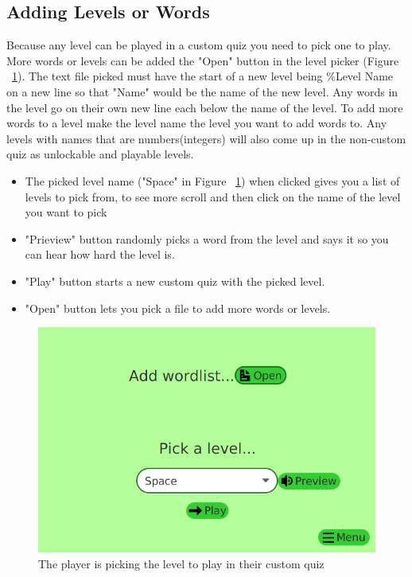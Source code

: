 \documentclass[12pt,a4paper,titlepage,onecolumn]{article}
\begin{document}
		\subsection{Adding Levels or Words}\label{addlist}
		Because any level can be played in a custom quiz you need to pick one to play.\\ More words or levels can be added the "Open" button in the level picker (Figure ~\ref{fig:CustomLevelPicker}). The text file picked must have the start of a new level being \%Level Name on a new line so that "Name" would be the name of the new level. Any words in the level go on their own new line each below the name of the level. To add more words to a level make the level name the level you want to add words to. Any levels with names that are numbers(integers) will also come up in the non-custom quiz as unlockable and playable levels.
		\begin{itemize}
			\item The picked level name ("Space" in Figure ~\ref{fig:CustomLevelPicker}) when clicked gives you a list of levels to pick from, to see more scroll and then click on the name of the level you want to pick
			\item "Prieview" button randomly picks a word from the level and says it so you can hear how hard the level is.
			\item "Play" button starts a new custom quiz with the picked level.
			\item "Open" button lets you pick a file to add more words or levels.
		\end{itemize}
		\begin{figure}[h]
		\centering
		\includegraphics[width=1\linewidth]{Figures/CustomQuiz/CustomLevelPicker}
		\caption[Custom Level Picker]{The player is picking the level to play in their custom quiz}
		\label{fig:CustomLevelPicker}
		\end{figure}
\end{document}
